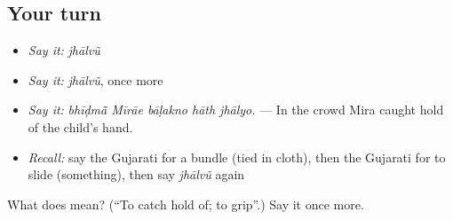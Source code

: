\subsection*{Your turn}
\begin{itemize}
\raggedright
  \item \emph{Say it:} \emph{jhālvũ}
  \item \emph{Say it:} \emph{jhālvũ}, once more
  \item \emph{Say it:} \emph{bhīḍmā̃ Mīrāe bāḷakno hāth jhālyo.} — In the crowd Mira caught hold of the child's hand.
  \item \emph{Recall:} say the Gujarati for a bundle (tied in cloth), then the Gujarati for to slide (something), then say \emph{jhālvũ} again
\end{itemize}

\begin{tcolorbox}[breakable,colback=teal!4,colframe=teal!35!black,title={Before you move on}]
What does  mean? (\textquotedblleft{}To catch hold of; to grip\textquotedblright{}.) Say it once more.
\end{tcolorbox}
